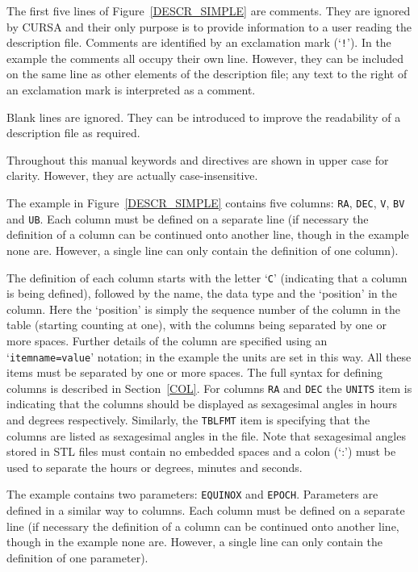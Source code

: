 \documentclass[twoside,11pt]{article}
\renewcommand{\_}{\texttt{\symbol{95}}}
\begin{document}
The first five lines of Figure~\ref{DESCR_SIMPLE} are
comments.  They are ignored by CURSA and their only purpose is to
provide information to a user reading the description file.  Comments
are identified by an exclamation mark (`{\tt !}').  In the example the
comments all occupy their own line.  However, they can be included on
the same line as other elements of the description file; any text to
the right of an exclamation mark is interpreted as a comment.

Blank lines are ignored.  They can be introduced to improve the
readability of a description file as required.

Throughout this manual keywords and directives are shown in upper
case for clarity.  However, they are actually case-insensitive.

The example in Figure~\ref{DESCR_SIMPLE} contains five columns: 
{\tt RA}, {\tt DEC}, {\tt V}, {\tt B\_V} and {\tt U\_B}.  Each column
must be defined on a separate line (if necessary the definition of a
column can be continued onto another line, though in the example none
are.  However, a single line can only contain the definition of one
column).

The definition of each column starts with the letter `{\tt C}'
(indicating that a column is being defined), followed by the name, the
data type and the `position' in the column.  Here the `position' is
simply the sequence number of the column in the table (starting counting
at one), with the columns being separated by one or more spaces.  Further
details of the column are specified using an `{\tt item\_name=value}'
notation; in the example the units are set in this way.  All these items
must be separated by one or more spaces.  The full syntax for defining
columns is described in Section~\ref{COL}.  For columns {\tt RA} and
{\tt DEC} the {\tt UNITS} item is indicating that the columns should be
displayed as sexagesimal angles in hours and degrees respectively.
Similarly, the {\tt TBLFMT} item is specifying that the columns are
listed as sexagesimal angles in the file.  Note that sexagesimal angles
stored in STL files must contain no embedded spaces and a colon (`:')
must be used to separate the hours or degrees, minutes and seconds.

The example contains two parameters: {\tt EQUINOX} and {\tt EPOCH}.
Parameters are defined in a similar way to columns.  Each column
must be defined on a separate line (if necessary the definition of a
column can be continued onto another line, though in the example none
are.  However, a single line can only contain the definition of one
parameter).
\end{document}
